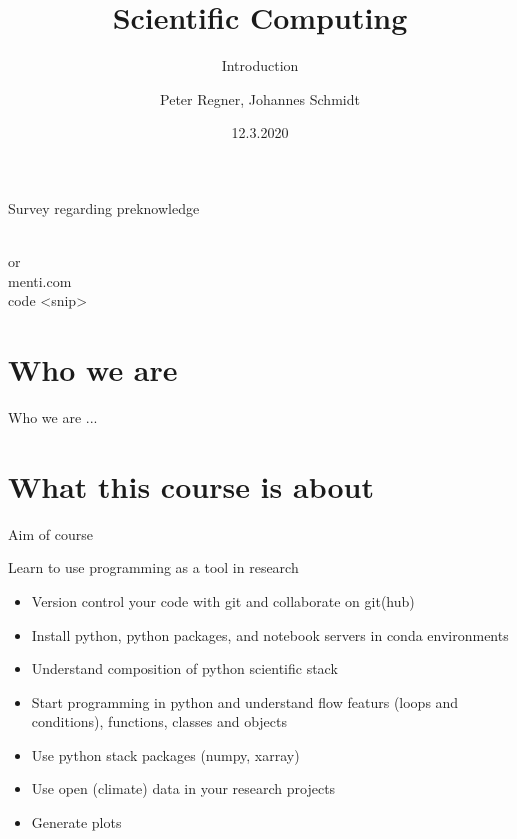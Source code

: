 \documentclass[10pt,color=usenames,dvipsnames]{beamer}
\title[Scientific Computing]{Scientific Computing}
\subtitle{Introduction}
\author{Peter Regner, Johannes Schmidt}
\institute{Institute for Sustainable Economic Development, BOKU, Wien}
\date{12.3.2020}
\begin{document}
\begin{frame}
\vspace{2cm}
\maketitle

\end{frame}

\begin{frame}{Survey regarding preknowledge}
    \begin{center}
        \textcolor{black}{
        }\\
        \vspace{0.5cm}
        \huge{
            or\\
            menti.com\\
            code <snip>
        }
    \end{center}
\end{frame}

\begin{frame}
	
	\tableofcontents
	
\end{frame}

\section{Who we are}

\begin{frame}{Who we are}
...	
\end{frame}

\section{What this course is about}

\begin{frame}{Aim of course}
	
	Learn to use programming as a tool in research
	
	\begin{itemize}
		\item Version control your code with git and collaborate on git(hub)
		\item Install python, python packages, and notebook servers in conda environments
		\item Understand composition of python scientific stack
		\item Start programming in python and understand flow featurs (loops and conditions), functions, classes and objects
		\item Use python stack packages (numpy, xarray)
		\item Use open (climate) data in your research projects
		\item Generate plots
	\end{itemize}
	
\end{frame}
\end{document}
